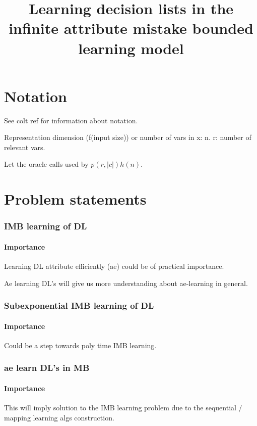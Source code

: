 \documentclass[10pt]{amsart}
\title{Learning decision lists in the infinite attribute mistake bounded learning model}
\begin{document}
\maketitle

\part{Notation}
See colt ref for information about notation.

Representation dimension (f(input size)) or number of vars in x: n. r: number of relevant vars.

Let the oracle calls used by $p(r, |c|)h(n)$.

\part{Problem statements}
\section{IMB learning of DL}

\subsection{Importance}
Learning DL attribute efficiently (ae) could be of practical importance.

Ae learning DL's will give us more understanding about ae-learning in general.

\section{Subexponential IMB learning of DL}

\subsection{Importance}
Could be a step towards poly time IMB learning.

\section{ae learn DL's in MB}

\subsection{Importance}
This will imply solution to the IMB learning problem due to the sequential / mapping learning algs construction.
\end{document}
